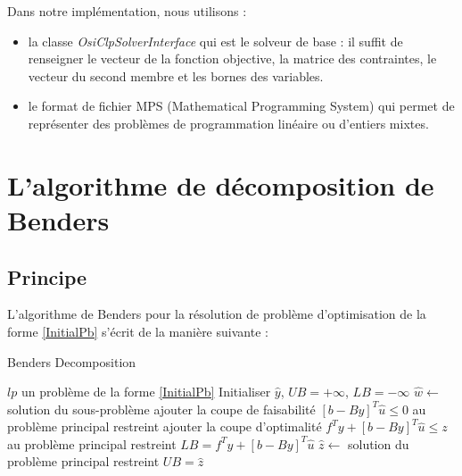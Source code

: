 \documentclass[a4paper]{article}
\begin{document}
Dans notre implémentation, nous utilisons :
\begin{itemize}
\item la classe \textit{OsiClpSolverInterface} qui est le solveur de base : il suffit de renseigner le vecteur de la fonction objective, la matrice des contraintes, le vecteur du second membre et les bornes des variables.
\item le format de fichier MPS (Mathematical Programming System) qui permet de représenter des problèmes de programmation linéaire ou d'entiers mixtes.
\end{itemize}

\section{L'algorithme de décomposition de Benders}
\subsection{Principe}
L'algorithme de Benders pour la résolution de problème d'optimisation de la forme \ref{InitialPb} s'écrit de la manière suivante :

\begin{algorithm}[H]
\caption{\label{benders_algo}Benders Decomposition}
\begin{algorithmic}
\renewcommand{\algorithmicrequire}{\textbf{Input:}}
\renewcommand{\algorithmicensure}{\textbf{Output:}}
  \REQUIRE $lp$ un problème de la forme \ref{InitialPb}
  \STATE Initialiser $\hat{y}$, $UB=+\infty$, $LB=-\infty$
    \STATE $\hat{w} \leftarrow$ solution du sous-problème
    	\STATE ajouter la coupe de faisabilité $[b - By]^{T}\hat{u} \leq 0$ au problème principal restreint
    \ELSE
    	\STATE ajouter la coupe d'optimalité $f^{T}y + [b - By]^{T}\hat{u} \leq z$ au problème principal restreint
        \STATE $LB = f^{T}y + [b - By]^{T}\hat{u}$
    \ENDIF
    \STATE $\hat{z} \leftarrow$ solution du problème principal restreint
    \STATE $UB = \hat{z}$ 
  \ENDWHILE
\end{algorithmic}
\end{algorithm}
\end{document}
